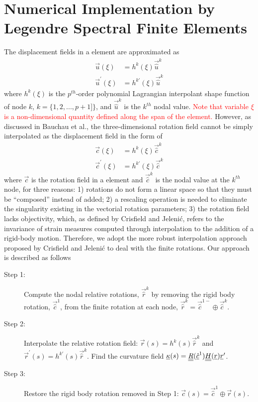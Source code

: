 \section{Numerical Implementation by Legendre Spectral Finite Elements}
The displacement fields in a element are approximated as
\begin{align}
    \label{InterpolateDisp}
    \vec{u}(\xi) &= h^k(\xi) \vec{\hat{u}}^k \\
    \label{InterpolateDispp}
    \vec{u}^\prime(\xi) &= h^{k\prime}(\xi) \vec{\hat{u}}^k
\end{align}
where $h^k(\xi)$ is the $p^{th}$-order polynomial
Lagrangian interpolant shape function of node $k$, $k=\{1,2,...,p+1]\}$, 
and $\vec{\hat{u}}^k$ is
the $k^{th}$ nodal value. \textcolor{red}{Note that variable $\xi$ is a non-dimensional quantity defined along the span of the element.}
However, as discussed in Bauchau et al.\cite{Bauchau-etal:2009}, the three-dimensional rotation field cannot be
simply interpolated as the displacement field in the form of
\begin{align}
    \label{InterpolateRot}
    \vec{c}(\xi) &= h^k(\xi) \vec{\hat{c}}^k \\
    \label{InterpolateRotp}
    \vec{c}^\prime(\xi) &= h^{k \prime}(\xi) \vec{\hat{c}}^k 
\end{align}    
where $\vec{c}$ is the rotation field in a element and $\vec{\hat{c}}^k$ is
the nodal value at the $k^{th}$ node, for three reasons: 1) rotations do not
form a linear space so that they must be  ``composed'' instead of added; 2)
a rescaling operation is needed to eliminate the singularity existing in the
vectorial rotation parameters; 3) the rotation field lacks objectivity,
which, as
defined by Crisfield and Jeleni\'c\cite{Crisfield1999}, refers to the
invariance of strain measures computed through interpolation to the addition
of a rigid-body motion. Therefore, we adopt the more robust interpolation
approach proposed by Crisfield and Jeleni\'c \cite{Crisfield1999} to deal
with the finite rotations. Our approach is described as follows
\begin{description}
    \item[Step 1:] Compute the nodal relative rotations, $\vec{\hat{r}}^k$
by removing the rigid body  rotation, $\vec{\hat{c}}^1$, from the finite rotation at each node, $\vec{\hat{r}}^k = \vec{\hat{c}}^{1-} \oplus \vec{\hat{c}}^k$.
    \item[Step 2:] Interpolate the relative rotation field: $\vec{r}(s) = h^k(s) \vec{\hat{r}}^k$ and $\vec{r}^\prime(s) = h^{k \prime}(s) \vec{\hat{r}}^k$. Find the curvature field $\underline{\kappa}(s) = \underline{\underline{R}}(\underline{\hat{c}}^1) \underline{\underline{H}}(\underline{r}) \underline{r}^\prime$.
    \item[Step 3:] Restore the rigid body rotation removed in Step 1: $\vec{c}(s) = \vec{\hat{c}}^1 \oplus \vec{r}(s)$.
\end{description} 
